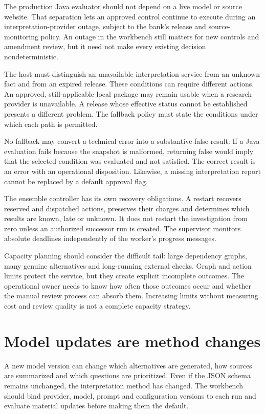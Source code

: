 The production Java evaluator should not depend on a live model or source website.
That separation lets an approved control continue to execute during an
interpretation-provider outage, subject to the bank's release and source-monitoring
policy. An outage in the workbench still matters for new controls and amendment
review, but it need not make every existing decision nondeterministic.

The host must distinguish an unavailable interpretation service from an unknown
fact and from an expired release. These conditions can require different actions.
An approved, still-applicable local package may remain usable when a research
provider is unavailable. A release whose effective status cannot be established
presents a different problem. The fallback policy must state the conditions under
which each path is permitted.

No fallback may convert a technical error into a substantive false result. If a
Java evaluation fails because the snapshot is malformed, returning false would
imply that the selected condition was evaluated and not satisfied. The correct
result is an error with an operational disposition. Likewise, a missing
interpretation report cannot be replaced by a default approval flag.

The ensemble controller has its own recovery obligations. A restart recovers
reserved and dispatched actions, preserves their charges and determines which
results are known, late or unknown. It does not restart the investigation from
zero unless an authorized successor run is created. The supervisor monitors
absolute deadlines independently of the worker's progress messages.

Capacity planning should consider the difficult tail: large dependency graphs,
many genuine alternatives and long-running external checks. Graph and action
limits protect the service, but they create explicit incomplete outcomes. The
operational owner needs to know how often those outcomes occur and whether the
manual review process can absorb them. Increasing limits without measuring cost
and review quality is not a complete capacity strategy.

\section{Model updates are method changes}

A new model version can change which alternatives are generated, how sources are
summarized and which questions are prioritized. Even if the JSON schema remains
unchanged, the interpretation method has changed. The workbench should bind
provider, model, prompt and configuration versions to each run and evaluate
material updates before making them the default.

